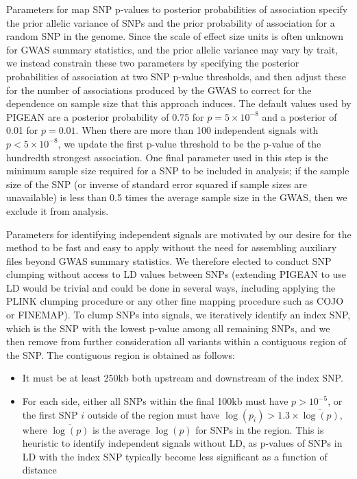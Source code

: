\documentclass[11pt]{article}
\begin{document}
{Parameters for map SNP
p-values to posterior probabilities of association specify the prior allelic variance of SNPs\cite{} and the prior
probability of association for a random SNP in the genome. Since the
scale of effect size units is often unknown for GWAS summary
statistics, and the prior allelic variance may vary by trait, we
instead constrain these two parameters by specifying the posterior
probabilities of association at two SNP p-value thresholds, and then
adjust these for the number of associations produced by the GWAS to
correct for the dependence on sample size that this approach
induces\cite{}. The default values used by PIGEAN are a posterior
probability of 0.75 for $p=5\times10^{-8}$ and a posterior of 0.01 for
$p=0.01$. When there are more than 100 independent signals with
$p<5\times10^{-8}$, we update the first p-value threshold to be the
p-value of the hundredth strongest association. One final parameter
used in this step is the minimum sample size required for a SNP to be
included in analysis; if the sample size of the SNP (or inverse of
standard error squared
if sample sizes are unavailable) is less than 0.5 times the average
sample size in the GWAS, then we exclude it from analysis.

Parameters for identifying independent
signals are motivated by our desire for the method to be fast and easy
to apply without the need for assembling auxiliary files beyond GWAS
summary statistics. We therefore elected to conduct SNP clumping 
without access to LD values between SNPs (extending PIGEAN to use LD
would be trivial and could be done in several ways, including applying
the PLINK clumping procedure\cite{} or any other fine mapping
procedure such as COJO\cite{} or FINEMAP\cite{}). To clump SNPs into signals, we
iteratively identify an index SNP, which is the SNP with the lowest
p-value among all remaining SNPs, and we then remove from further consideration
all variants within a contiguous region of the SNP. The contiguous
region is obtained as follows:
\begin{itemize}
  \item It must be at least 250kb both upstream and downstream of the
    index SNP.
 \item For each side, either all SNPs within the final 100kb must have $p>10^{-5}$, or
    the first SNP $i$ outside of the region must have $\log(p_i) > 1.3 \times
    \overline{\log(p)}$, where $\overline{\log(p)}$ is the average
    $\log(p)$ for SNPs in the region. This is heuristic to identify independent signals
    without LD, as p-values of SNPs in LD with the index SNP typically
    become less significant as a function of distance
\end{itemize}

}
\end{document}
